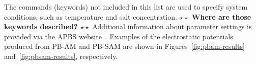 \documentclass[12pt,titlepage]{article}
\newcommand{\todo}[1]{\textbf{$\star \star$ {#1} $\star \star$}}
\begin{document}
The commands (keywords) not included in this list are used to specify system conditions, such as temperature and salt concentration. \todo{Where are those keywords described?}
Additional information about parameter settings is provided via the APBS website~\cite{APBSweb}. Examples of the electrostatic potentials produced from PB-AM and PB-SAM are shown in Figures~\ref{fig:pbam-results} and~\ref{fig:pbsam-results}, respectively.


\end{document}
